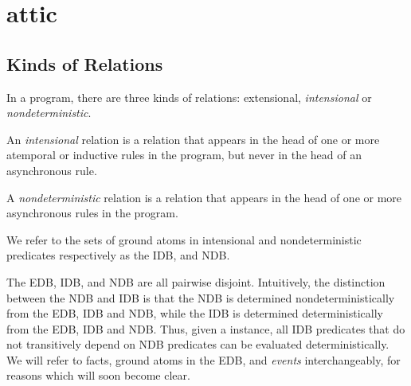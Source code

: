 \section{attic}

\subsection{Kinds of Relations}
    
In a \lang program, there are three kinds of relations:
extensional, {\em intensional} or {\em nondeterministic}.

\begin{definition}
%
An \emph{intensional} relation is a relation that appears
in the head of one or more atemporal or inductive rules in the program, but
never in the head of an asynchronous rule.~
%
\end{definition}
\begin{definition}
%
A \emph{nondeterministic} relation is a relation that
appears in the head of one or more asynchronous rules in the program.
%
\end{definition}
We refer to the sets of ground atoms in intensional and nondeterministic
predicates respectively as the IDB, and NDB.

The EDB, IDB, and NDB are all pairwise disjoint.  Intuitively, the distinction
between the NDB and IDB is that the NDB is determined nondeterministically~ from
the EDB, IDB and NDB, while the IDB is determined deterministically from the
EDB, IDB and NDB.  Thus, given a \lang instance, all IDB predicates that do
not transitively depend on NDB predicates can be evaluated deterministically.
We will refer to facts, ground atoms in the EDB, and \emph{events}
interchangeably, for reasons which will soon become clear.

